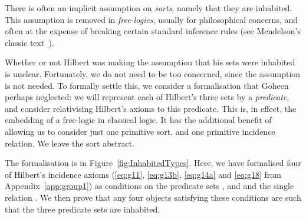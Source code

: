 There is often an implicit assumption on \emph{sorts}, namely that they are inhabited. This assumption is removed in \emph{free-logics}, usually for philosophical concerns, and often at the expense of breaking certain standard inference rules (see Mendelson's classic text~\cite{Mendelson}). 

Whether or not Hilbert was making the assumption that his sets were inhabited is unclear. Fortunately, we do not need to be too concerned, since the assumption is not needed. To formally settle this, we consider a formalisation that Goheen perhaps neglected: we will represent each of Hilbert's three sets by a \emph{predicate}, and consider relativising Hilbert's axioms to this predicate. This is, in effect, the embedding of a free-logic in classical logic. It has the additional benefit of allowing us to consider just one primitive sort, and one primitive incidence relation. We leave the sort abstract.

The formalisation is in Figure~\ref{fig:InhabitedTypes}. Here, we have formalised four of Hilbert's incidence axioms (\ref{eq:g11}, \ref{eq:g13b}, \ref{eq:g14a} and \ref{eq:g18} from Appendix~\ref{app:group1}) as conditions on the predicate sets ,  and  and the single relation . We then prove that any four objects satisfying these conditions are such that the three predicate sets are inhabited.


